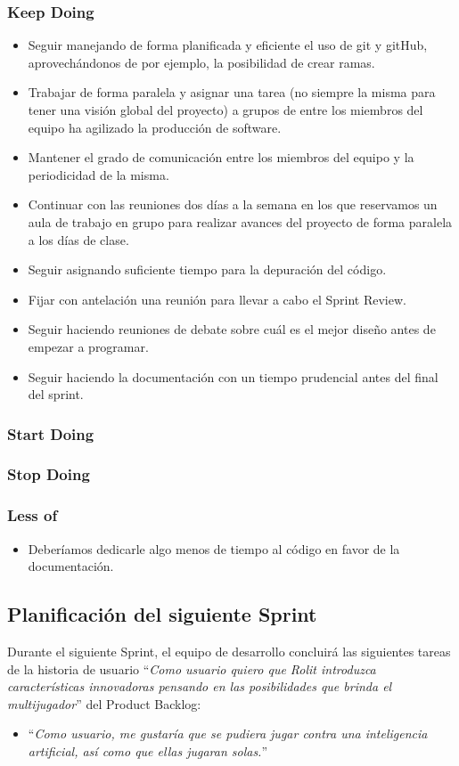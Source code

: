 \documentclass[../../SCRUM.tex]{subfiles}
\begin{document}
\subsubsection*{Keep Doing}
\begin{itemize}
\item
  Seguir manejando de forma planificada y eficiente el uso de git y
  gitHub, aprovechándonos de por ejemplo, la posibilidad de crear ramas.
\item
  Trabajar de forma paralela y asignar una tarea (no siempre la misma
  para tener una visión global del proyecto) a grupos de entre los
  miembros del equipo ha agilizado la producción de software.
\item
  Mantener el grado de comunicación entre los miembros del equipo y la
  periodicidad de la misma.
\item
  Continuar con las reuniones dos días a la semana en los que reservamos
  un aula de trabajo en grupo para realizar avances del proyecto de
  forma paralela a los días de clase.
\item
  Seguir asignando suficiente tiempo para la depuración del código.
\item
  Fijar con antelación una reunión para llevar a cabo el Sprint Review.
\item
  Seguir haciendo reuniones de debate sobre cuál es el mejor diseño
  antes de empezar a programar.
\item
  Seguir haciendo la documentación con un tiempo prudencial antes del
  final del sprint.
\end{itemize}

\subsubsection*{Start Doing}

\subsubsection*{Stop Doing}

\subsubsection*{Less of}
\begin{itemize}
\item
  Deberíamos dedicarle algo menos de tiempo al código en favor de la
  documentación.
\end{itemize}

\subsection{Planificación del siguiente Sprint}
Durante el siguiente Sprint, el equipo de desarrollo concluirá las siguientes tareas de la historia de usuario ``\textit{Como usuario quiero que Rolit introduzca características innovadoras pensando en las posibilidades que brinda el multijugador}'' del Product Backlog:
\begin{itemize}
\item ``\textit{Como usuario, me gustaría que se pudiera jugar
contra una inteligencia artificial, así como que ellas jugaran solas.}''
\end{itemize}
\end{document}

